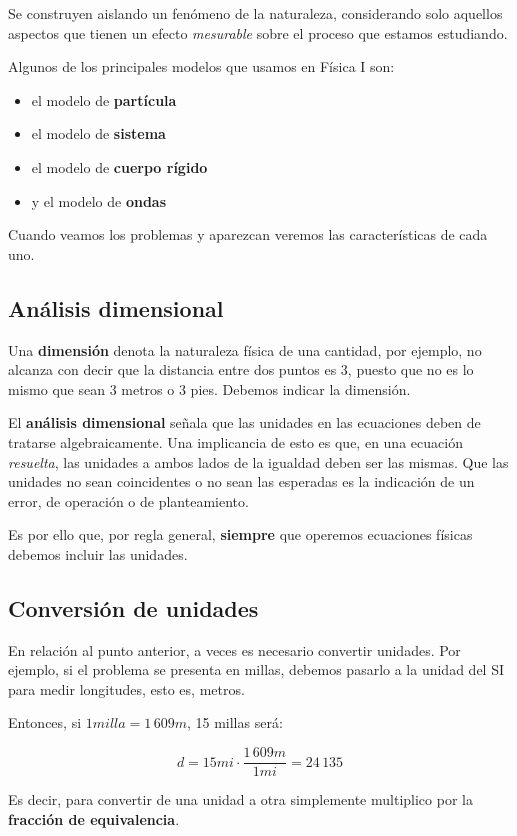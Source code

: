 Se construyen aislando un fenómeno de la naturaleza,
considerando solo aquellos aspectos que tienen un efecto \textit{mesurable}
sobre el proceso que estamos estudiando.

Algunos de los principales modelos que usamos en Física I son: 
\begin{itemize}
    \item el modelo de \textbf{partícula}
    \item el modelo de \textbf{sistema}
    \item el modelo de \textbf{cuerpo rígido}
    \item y el modelo de \textbf{ondas}
\end{itemize}

Cuando veamos los problemas y aparezcan veremos las características de cada uno.

\subsection{Análisis dimensional}

Una \textbf{dimensión} denota la naturaleza física de una cantidad,
por ejemplo, 
no alcanza con decir que la distancia entre dos puntos es 3,
puesto que no es lo mismo que sean 3 metros o 3 pies.
Debemos indicar la dimensión.

El \textbf{análisis dimensional} señala que las unidades en las ecuaciones deben
de tratarse algebraicamente. 
Una implicancia de esto es que,
en una ecuación \textit{resuelta},
las unidades a ambos lados de la igualdad deben ser las mismas.
Que las unidades no sean coincidentes o no sean las esperadas es la indicación 
de un error,
de operación o de planteamiento.

Es por ello que,
por regla general,
\textbf{siempre} que operemos ecuaciones físicas debemos incluir las unidades.

\subsection{Conversión de unidades}

En relación al punto anterior,
a veces es necesario convertir unidades.
Por ejemplo,
si el problema se presenta en millas,
debemos pasarlo a la unidad del SI para medir longitudes,
esto es,
metros.

Entonces, si \(1 milla = 1\,609m\), 15 millas será:

\begin{equation*}
    d = 15 mi \cdot \frac{1\,609m}{1 mi} = 24\,135
\end{equation*}

Es decir,
para convertir de una unidad a otra simplemente multiplico por la 
\textbf{fracción de equivalencia}.

